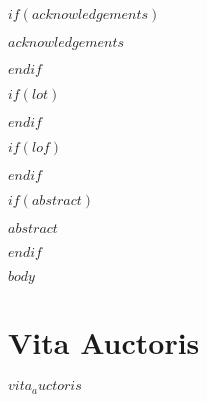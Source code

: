 \documentclass[phdthesis,12pt,final]{wuthesis}
\begin{document}
$if(acknowledgements)$
\cleardoublepage
\begin{thesisacknowledgments}
$acknowledgements$
\end{thesisacknowledgments}
$endif$

\cleardoublepage
\begin{singlespace}
\setcounter{page}{2}
\renewcommand*\contentsname{Table of Contents}
\tableofcontents
\end{singlespace}

$if(lot)$
\cleardoublepage
{}
{}
\begin{center}
\end{center}
\vspace{1em}
\begin{singlespace}
\listoftables
\end{singlespace}
$endif$

$if(lof)$
\cleardoublepage
{}
{}
\begin{center}
\end{center}
\vspace{1em}
\begin{singlespace}
\listoffigures
\end{singlespace}
$endif$

$if(abstract)$
\cleardoublepage
\begin{thesisabstract}
$abstract$
\end{thesisabstract}
$endif$

\cleardoublepage
{}
\setcounter{page}{1}

$body$

\backmatter

\cleardoublepage
{}
{}
\chapter*{Vita Auctoris}
\begin{doublespace}
$vita_auctoris$
\end{doublespace}
\end{document}
